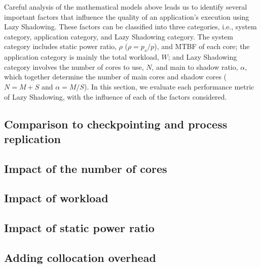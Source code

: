 Careful analysis of the mathematical models above leads us to identify several important factors that influence the quality of an application's execution using Lazy Shadowing. These factors can be classified into three categories, i.e., system category, application category, and Lazy Shadowing category. The system category includes static power ratio, $\rho$ ($\rho=p_s/p$), and MTBF of each core; the application category is mainly the total workload, $W$; and Lazy Shadowing category involves the number of cores to use, $N$, and main to shadow ratio, $\alpha$, which together determine the number of main cores and shadow cores ($N=M+S$ and $\alpha=M/S$). In this section, we evaluate each performance metric of Lazy Shadowing, 
 with the influence of each of the factors considered. %

%

%

%

\subsection{Comparison to checkpointing and process replication}
\label{eval_comparison}


\subsection{Impact of the number of cores}
\label{eval_core}


\subsection{Impact of workload}
\label{eval_workload}


\subsection{Impact of static power ratio}
\label{eval_static_power}


\subsection{Adding collocation overhead}
\label{eval_collocation}

